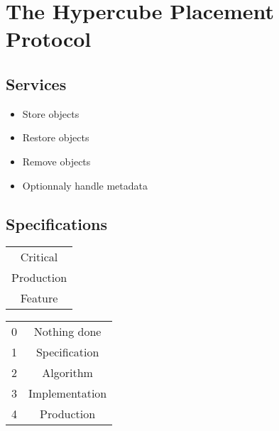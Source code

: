 \section{The Hypercube Placement Protocol}
\subsection{Services}
\begin{itemize}
 \item Store objects
 \item Restore objects
 \item Remove objects
 \item Optionnaly handle metadata
\end{itemize}


\subsection{Specifications}
\begin{minipage}{0.49\textwidth}
    \begin{tabular}{|c|}
      \hline
      Critical\\
      Production\\
      Feature\\ 
      \hline
    \end{tabular}
\end{minipage}
\begin{minipage}{0.49\textwidth}
    \begin{tabular}{|c|c|}
      \hline
      0 & Nothing done\\
      1 & Specification\\
      2 & Algorithm\\
      3 & Implementation\\ 
      4 & Production\\
      \hline
     \end{tabular}
\end{minipage}




